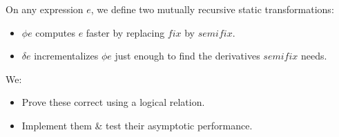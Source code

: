 \documentclass[aspectratio=169,dvipsnames]{beamer}
\newcommand\D\Delta
\newcommand\isa{\mathrel{\,\ratio\,}}
\newcommand\n\mathit
\newcommand\tpname\mathrm
\newcommand\tset{\tpname{Set}~}
\newcommand\fix{\n{fix}}
\newcommand\semifix{\n{semifix}}
\newcommand\hilite{\color{Rhodamine}}
\newcommand\hi[1]{{\hilite#1}}
\begin{document}


  \begin{frame}\Large

    On any expression $e$, we define two
    mutually recursive static transformations:\vspace{1ex}
    \begin{itemize}\setlength\itemsep{1ex}
    \item \hi{$\phi e$} computes $e$ faster by replacing $\fix$ by $\semifix$.

    \item \hi{$\delta e$} incrementalizes $\phi e$ just enough to find the
      derivatives $\semifix$ needs.
    \end{itemize}
    \vspace{1ex}

    We:\vspace{1ex}
    \begin{itemize}\setlength\itemsep{1ex}
    \item Prove these correct using a logical relation.
    \item Implement them \& test their asymptotic performance.
    \end{itemize}
  \end{frame}
\end{document}
